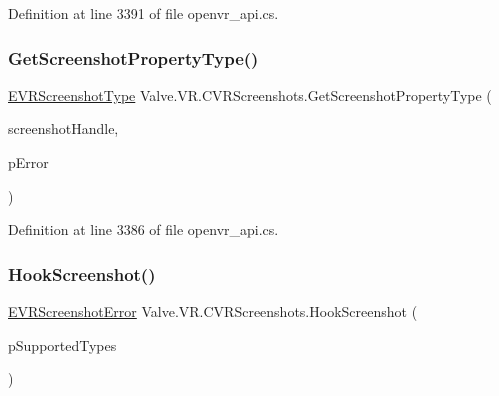 Definition at line 3391 of file openvr\+\_\+api.\+cs.

\mbox{\label{class_valve_1_1_v_r_1_1_c_v_r_screenshots_a6442fc8cc137ca7a4b8ed40b4bfdb268}} 
\subsubsection{\texorpdfstring{GetScreenshotPropertyType()}{GetScreenshotPropertyType()}}
{\footnotesize\ttfamily \mbox{\hyperlink{namespace_valve_1_1_v_r_a033ac579445f0992130b11ba62c9b7ae}{E\+V\+R\+Screenshot\+Type}} Valve.\+V\+R.\+C\+V\+R\+Screenshots.\+Get\+Screenshot\+Property\+Type (\begin{DoxyParamCaption}\item[{uint}]{screenshot\+Handle,  }\item[{ref \mbox{\hyperlink{namespace_valve_1_1_v_r_ac73c6dcb1af8fe045a626296a21e226b}{E\+V\+R\+Screenshot\+Error}}}]{p\+Error }\end{DoxyParamCaption})}



Definition at line 3386 of file openvr\+\_\+api.\+cs.

\mbox{\label{class_valve_1_1_v_r_1_1_c_v_r_screenshots_a83f44065529a466aa653c14c6a67cfc3}} 
\subsubsection{\texorpdfstring{HookScreenshot()}{HookScreenshot()}}
{\footnotesize\ttfamily \mbox{\hyperlink{namespace_valve_1_1_v_r_ac73c6dcb1af8fe045a626296a21e226b}{E\+V\+R\+Screenshot\+Error}} Valve.\+V\+R.\+C\+V\+R\+Screenshots.\+Hook\+Screenshot (\begin{DoxyParamCaption}\item[{\mbox{\hyperlink{namespace_valve_1_1_v_r_a033ac579445f0992130b11ba62c9b7ae}{E\+V\+R\+Screenshot\+Type}} \mbox{[}$\,$\mbox{]}}]{p\+Supported\+Types }\end{DoxyParamCaption})}



